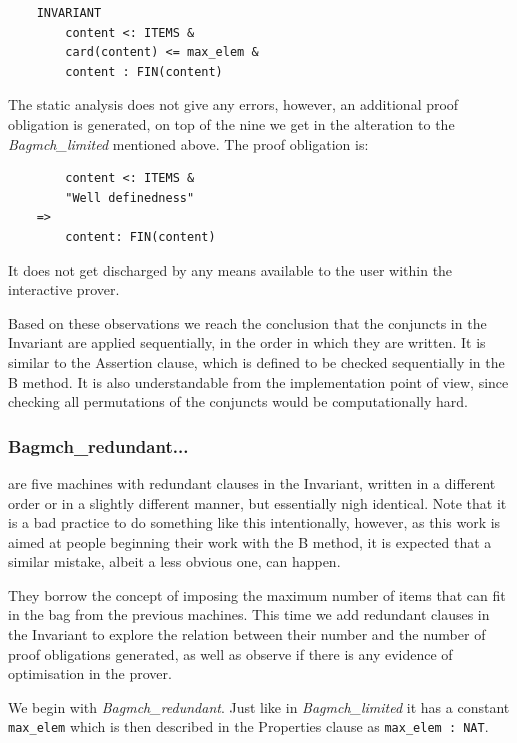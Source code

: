 \documentclass[12pt,journal,duplex]{IEEEtran}
\begin{document}
	\begin{lstlisting}
	INVARIANT
		content <: ITEMS &
		card(content) <= max_elem &
		content : FIN(content)
	\end{lstlisting}

	The static analysis does not give any errors, however, an additional proof obligation is generated, on top of the nine we get in the alteration to the \emph{Bagmch\_limited} mentioned above. The proof obligation is:

	\begin{lstlisting}
    	content <: ITEMS &
		"Well definedness"
	=>
		content: FIN(content)
	\end{lstlisting}

	It does not get discharged by any means available to the user within the interactive prover.

	Based on these observations we reach the conclusion that the conjuncts in the Invariant are applied sequentially, in the order in which they are written. It is similar to the Assertion clause, which is defined to be checked sequentially in the B method. It is also understandable from the implementation point of view, since checking all permutations of the conjuncts would be computationally hard.

	\subsubsection{Bagmch\_redundant...} are five machines with redundant clauses in the Invariant, written in a different order or in a slightly different manner, but essentially nigh identical. Note that it is a bad practice to do something like this intentionally, however, as this work is aimed at people beginning their work with the B method, it is expected that a similar mistake, albeit a less obvious one, can happen.

	They borrow the concept of imposing the maximum number of items that can fit in the bag from the previous machines. This time we add redundant clauses in the Invariant to explore the relation between their number and the number of proof obligations generated, as well as observe if there is any evidence of optimisation in the prover.

	We begin with \emph{Bagmch\_redundant}. Just like in \emph{Bagmch\_limited} it has a constant \texttt{max\_elem} which is then described in the Properties clause as \texttt{max\_elem : NAT}.
\end{document}
